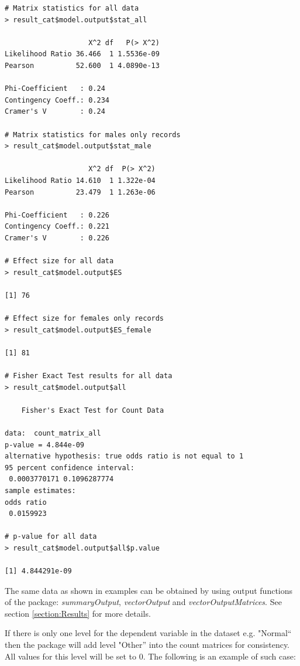 \documentclass[12pt,a4paper]{article}
\begin{document}
\begin{verbatim}
# Matrix statistics for all data
> result_cat$model.output$stat_all

                    X^2 df   P(> X^2)
Likelihood Ratio 36.466  1 1.5536e-09
Pearson          52.600  1 4.0890e-13

Phi-Coefficient   : 0.24 
Contingency Coeff.: 0.234 
Cramer's V        : 0.24 

# Matrix statistics for males only records
> result_cat$model.output$stat_male

                    X^2 df  P(> X^2)
Likelihood Ratio 14.610  1 1.322e-04
Pearson          23.479  1 1.263e-06

Phi-Coefficient   : 0.226 
Contingency Coeff.: 0.221 
Cramer's V        : 0.226 

# Effect size for all data
> result_cat$model.output$ES

[1] 76

# Effect size for females only records
> result_cat$model.output$ES_female

[1] 81

# Fisher Exact Test results for all data
> result_cat$model.output$all

	Fisher's Exact Test for Count Data

data:  count_matrix_all 
p-value = 4.844e-09
alternative hypothesis: true odds ratio is not equal to 1 
95 percent confidence interval:
 0.0003770171 0.1096287774 
sample estimates:
odds ratio 
 0.0159923
 
# p-value for all data
> result_cat$model.output$all$p.value

[1] 4.844291e-09
\end{verbatim}
\endgroup

The same data as shown in examples can be obtained by using output functions of the package: \textit{summaryOutput}, \textit{vectorOutput} and \textit{vectorOutputMatrices}. See section \ref{section:Results} for more details.

If there is only one level for the dependent variable in the dataset e.g. "Normal`` then the package will add level "Other'' into the count matrices for consistency. All values for this level will be set to 0.
The following is an example of such case:
\end{document}
